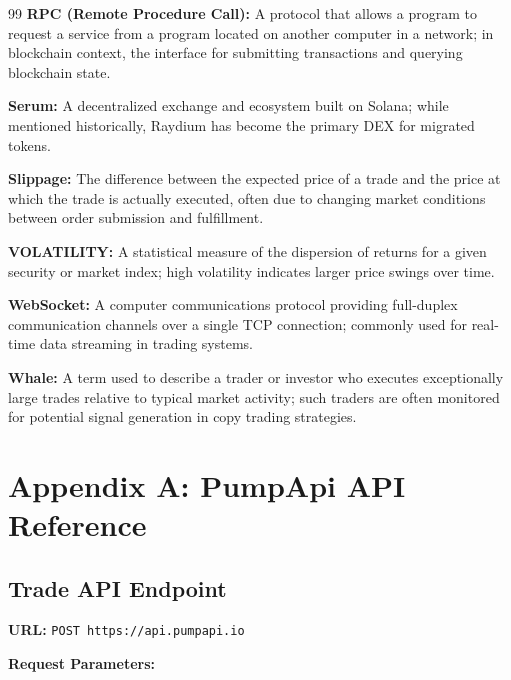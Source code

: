 \documentclass[12pt,a4paper]{article}
\begin{document}
\begin{thebibliography}{99}
\textbf{RPC (Remote Procedure Call):} A protocol that allows a program to request a service from a program located on another computer in a network; in blockchain context, the interface for submitting transactions and querying blockchain state.

\textbf{Serum:} A decentralized exchange and ecosystem built on Solana; while mentioned historically, Raydium has become the primary DEX for migrated tokens.

\textbf{Slippage:} The difference between the expected price of a trade and the price at which the trade is actually executed, often due to changing market conditions between order submission and fulfillment.

\textbf{VOLATILITY:} A statistical measure of the dispersion of returns for a given security or market index; high volatility indicates larger price swings over time.

\textbf{WebSocket:} A computer communications protocol providing full-duplex communication channels over a single TCP connection; commonly used for real-time data streaming in trading systems.

\textbf{Whale:} A term used to describe a trader or investor who executes exceptionally large trades relative to typical market activity; such traders are often monitored for potential signal generation in copy trading strategies.

\end{thebibliography}

\section{Appendix A: PumpApi API Reference}

\subsection*{Trade API Endpoint}

\textbf{URL:} \texttt{POST https://api.pumpapi.io}

\textbf{Request Parameters:}
\end{document}
